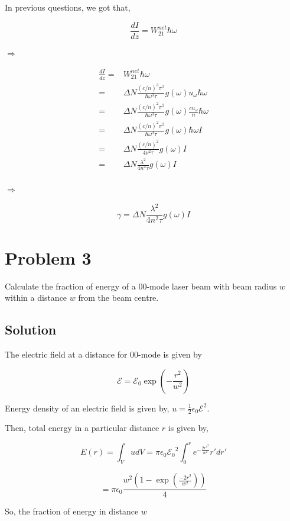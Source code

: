 \documentclass[a4paper,11pt]{article}
\begin{document}
In previous questions, we got that,

$$\frac{dI}{dz} = W_{21}^{net} \hbar \omega $$

\(\Rightarrow\)

\begin{equation}
\begin{split}
\frac{dI}{dz} = & W_{21}^{net} \hbar \omega \\
= & \Delta N \frac{(c/n)^3 \pi^2}{\hbar \omega^3\tau} g(\omega) u_\omega \hbar \omega \\
= & \Delta N \frac{(c/n)^2 \pi^2}{\hbar \omega^3\tau} g(\omega) \frac{c u_\omega}{n} \hbar \omega\\ 
= & \Delta N \frac{(c/n)^2 \pi^2}{\hbar \omega^3\tau} g(\omega)  \hbar \omega I\\ 
= & \Delta N \frac{(c/n)^2}{4\nu^2\tau} g(\omega) I\\ 
= & \Delta N \frac{\lambda^2}{4n^2 \tau} g(\omega) I\\ 
\end{split}
\end{equation}

\(\Rightarrow\)

$$\gamma = \Delta N \frac{\lambda^2}{4n^2 \tau} g(\omega) I$$

\newpage
\section*{Problem 3}
\label{sec:org7a9a878}
Calculate the fraction of energy of a 00-mode laser beam with beam radius \(w\) within a distance \(w\) from the beam centre.
\subsection*{Solution}
\label{sec:org9db3b7d}
The electric field at a distance for 00-mode is given by

$$\mathcal{E}=\mathcal{E}_0\exp\left(-\frac{r^2}{w^2}\right)$$

Energy density of an electric field is given by, \(u=\frac{1}{2}\epsilon_0\mathcal{E}^2\). 

Then, total energy in a particular distance \(r\) is given by,

$$E(r) = \int_V udV = \pi \epsilon_0 \mathcal{E_0}^2\int_0^r e^{-\frac{2r'^2}{w^2}} r'dr' $$ 

$$=\pi\epsilon_0\frac{w^2\left(1-\exp\left( \frac{-2 r^2}{w^2}\right)\right)}{4}$$

So, the fraction of energy in distance \(w\)
\end{document}

